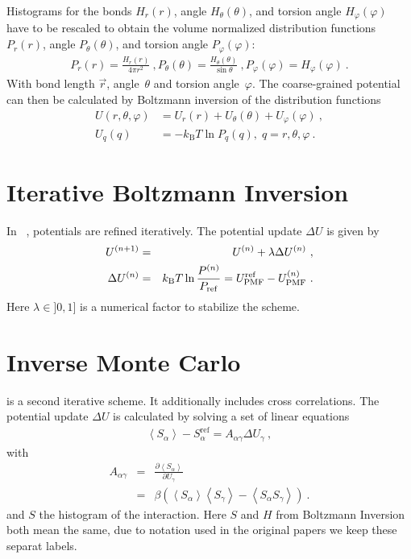 Histograms for the bonds $H_r(r)$, angle $H_\theta(\theta)$, and torsion angle $H_\varphi(\varphi)$ have to be rescaled to obtain the volume normalized distribution functions $P_r(r)$, angle $P_\theta(\theta)$, and torsion angle $P_\varphi(\varphi)$: 
%
\begin{align}
    P_r(r) = \frac{H_r(r)}{4\pi r^2}~,
    P_\theta(\theta) = \frac{H_\theta(\theta)}{\sin \theta}~,
    P_\varphi(\varphi) = H_\varphi (\varphi)~.
    \label{eq:boltzmann_norm}
\end{align}
With bond length $\vec{r}$, angle~$\theta$ and torsion angle~$\varphi$.%
The coarse-grained potential can then be calculated by Boltzmann inversion of the distribution functions
%
\begin{align}
    \label{eq:boltzmann_pmf}
    U({r}, \theta, \varphi) &= U_r({r}) + U_{\theta}(\theta) + U_{\varphi}(\varphi)~, \\
    U_q({q}) &= - k_\text{B} T \ln P_q( q ),\; q=r, \theta, \varphi~.
    \nonumber
\end{align}

\section{Iterative Boltzmann Inversion}
In \ibi~\cite{Reith:2003}, potentials are refined iteratively. The potential update $\Delta U$ is given by
\begin{eqnarray}
  \label{eq:iter_boltzmann}
  U^{(n+1)} &=& U^{(n)} + \lambda \Delta U^{(n)}~, \\
  \Delta U^{(n)} &=&  k_\text{B} T \ln  \frac{P^{(n)}}{P_{\rm ref}}
  =  U_\text{PMF}^\text{ref} - U_\text{PMF}^{(n)}~.
\end{eqnarray}
Here $\lambda \in ]0,1]$ is a numerical factor to stabilize the scheme.

\section{Inverse Monte Carlo}
\imc is a second iterative scheme. It additionally includes cross correlations. The potential update $\Delta U$ is calculated by solving a set of linear equations
\begin{align}
    \left<S_{\alpha}\right> - S_{\alpha}^{\text{ref}}= A_{\alpha \gamma} \Delta U_{\gamma}~,
  \label{eq:imc}
\end{align}
%
with
\begin{eqnarray}
  \label{eq:covariance}
  A_{\alpha \gamma} &=& \frac{\partial \left< S_{\alpha} \right> }{\partial U_{\gamma}}  \\
  \nonumber
  &=&
  \beta \left( \left<S_{\alpha} \right>\left<S_{\gamma} \right> - \left<S_{\alpha} S_{\gamma} \right>  \right)~.
  \nonumber
\end{eqnarray}
and $S$ the histogram of the interaction. Here $S$ and $H$ from Boltzmann Inversion both mean the same, due to notation used in the original papers we keep these separat labels.

